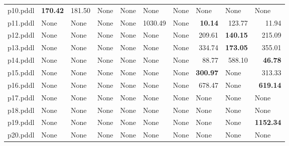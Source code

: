 \documentclass{article}
\begin{document}
\begin{tabular}{@{}lrrrrrrrrr@{}}
p10.pddl & \textbf{170.42} & 181.50 & \multicolumn{1}{|l|}{None} & \multicolumn{1}{|l|}{None} & \multicolumn{1}{|l|}{None} & \multicolumn{1}{|l|}{None} & \multicolumn{1}{|l|}{None} & \multicolumn{1}{|l|}{None} & \multicolumn{1}{|l|}{None} \\
p11.pddl & \multicolumn{1}{|l|}{None} & \multicolumn{1}{|l|}{None} & \multicolumn{1}{|l|}{None} & \multicolumn{1}{|l|}{None} & 1030.49 & \multicolumn{1}{|l|}{None} & \textbf{10.14} & 123.77 & 11.94 \\
p12.pddl & \multicolumn{1}{|l|}{None} & \multicolumn{1}{|l|}{None} & \multicolumn{1}{|l|}{None} & \multicolumn{1}{|l|}{None} & \multicolumn{1}{|l|}{None} & \multicolumn{1}{|l|}{None} & 209.61 & \textbf{140.15} & 215.09 \\
p13.pddl & \multicolumn{1}{|l|}{None} & \multicolumn{1}{|l|}{None} & \multicolumn{1}{|l|}{None} & \multicolumn{1}{|l|}{None} & \multicolumn{1}{|l|}{None} & \multicolumn{1}{|l|}{None} & 334.74 & \textbf{173.05} & 355.01 \\
p14.pddl & \multicolumn{1}{|l|}{None} & \multicolumn{1}{|l|}{None} & \multicolumn{1}{|l|}{None} & \multicolumn{1}{|l|}{None} & \multicolumn{1}{|l|}{None} & \multicolumn{1}{|l|}{None} & 88.77 & 588.10 & \textbf{46.78} \\
p15.pddl & \multicolumn{1}{|l|}{None} & \multicolumn{1}{|l|}{None} & \multicolumn{1}{|l|}{None} & \multicolumn{1}{|l|}{None} & \multicolumn{1}{|l|}{None} & \multicolumn{1}{|l|}{None} & \textbf{300.97} & \multicolumn{1}{|l|}{None} & 313.33 \\
p16.pddl & \multicolumn{1}{|l|}{None} & \multicolumn{1}{|l|}{None} & \multicolumn{1}{|l|}{None} & \multicolumn{1}{|l|}{None} & \multicolumn{1}{|l|}{None} & \multicolumn{1}{|l|}{None} & 678.47 & \multicolumn{1}{|l|}{None} & \textbf{619.14} \\
p17.pddl & \multicolumn{1}{|l|}{None} & \multicolumn{1}{|l|}{None} & \multicolumn{1}{|l|}{None} & \multicolumn{1}{|l|}{None} & \multicolumn{1}{|l|}{None} & \multicolumn{1}{|l|}{None} & \multicolumn{1}{|l|}{None} & \multicolumn{1}{|l|}{None} & \multicolumn{1}{|l|}{None} \\
p18.pddl & \multicolumn{1}{|l|}{None} & \multicolumn{1}{|l|}{None} & \multicolumn{1}{|l|}{None} & \multicolumn{1}{|l|}{None} & \multicolumn{1}{|l|}{None} & \multicolumn{1}{|l|}{None} & \multicolumn{1}{|l|}{None} & \multicolumn{1}{|l|}{None} & \multicolumn{1}{|l|}{None} \\
p19.pddl & \multicolumn{1}{|l|}{None} & \multicolumn{1}{|l|}{None} & \multicolumn{1}{|l|}{None} & \multicolumn{1}{|l|}{None} & \multicolumn{1}{|l|}{None} & \multicolumn{1}{|l|}{None} & \multicolumn{1}{|l|}{None} & \multicolumn{1}{|l|}{None} & \textbf{1152.34} \\
p20.pddl & \multicolumn{1}{|l|}{None} & \multicolumn{1}{|l|}{None} & \multicolumn{1}{|l|}{None} & \multicolumn{1}{|l|}{None} & \multicolumn{1}{|l|}{None} & \multicolumn{1}{|l|}{None} & \multicolumn{1}{|l|}{None} & \multicolumn{1}{|l|}{None} & \multicolumn{1}{|l|}{None} \\
\end{tabular}
\end{document}
